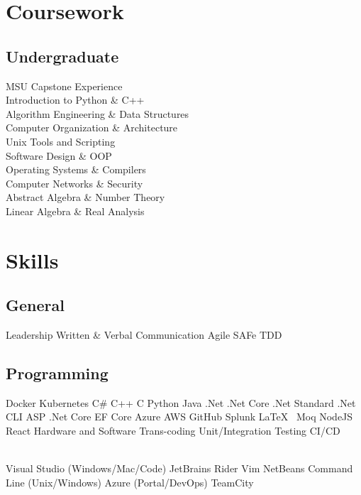 \documentclass[]{deedy-resume-openfont}
\begin{document}
\begin{minipage}[t]{0.33\textwidth}

\section{Coursework}

\subsection{Undergraduate}
MSU Capstone Experience \\
Introduction to Python \& C++ \\
Algorithm Engineering \& Data Structures \\
Computer Organization \& Architecture \\
Unix Tools and Scripting \\
Software Design \& OOP \\
Operating Systems \& Compilers \\
Computer Networks \& Security \\
Abstract Algebra \& Number Theory \\
Linear Algebra \& Real Analysis

\sectionsep


\section{Skills}
\subsection{General}
Leadership \textbullet{}
Written \& Verbal Communication \textbullet{}
Agile \textbullet{} SAFe \textbullet{} TDD
\subsection{Programming}
Docker \textbullet{} Kubernetes \textbullet{}  
C\# \textbullet{}   C++ \textbullet{} C \textbullet{} Python \textbullet{} Java \textbullet{}
.Net \textbullet{} .Net Core \textbullet{} 
.Net Standard  \textbullet{} .Net CLI \textbullet{} 
ASP .Net Core \textbullet{} EF Core \textbullet{} 
Azure \textbullet{} AWS \textbullet{} 
GitHub \textbullet{} Splunk \textbullet{} \LaTeX\ \textbullet{} Moq \textbullet{}
NodeJS \textbullet{} React \textbullet{}
Hardware and Software Trans-coding \textbullet{}
Unit/Integration Testing \textbullet{}
CI/CD

\\

Visual Studio (Windows/Mac/Code) \textbullet{} JetBrains Rider \textbullet{} Vim \textbullet{} NetBeans \textbullet{}
Command Line (Unix/Windows) \textbullet{}
Azure (Portal/DevOps) \textbullet{} TeamCity 


\sectionsep

%
%

\end{minipage} 
\end{document}
